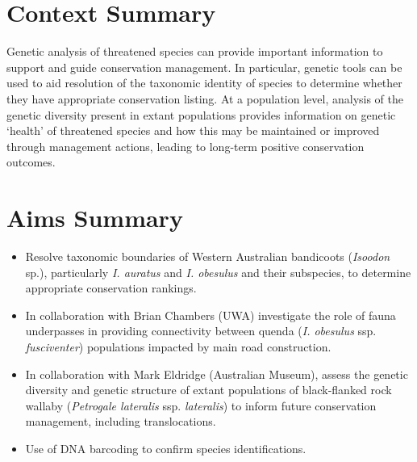 \documentclass[version=last, paper=a4, DIV=18, usenames, dvipsnames]{scrartcl}
\begin{document}
%

%




\section*{Context Summary}
Genetic analysis of threatened species can provide important information
to support and guide conservation management. In particular, genetic
tools can be used to aid resolution of the taxonomic identity of species
to determine whether they have appropriate conservation listing. At a
population level, analysis of the genetic diversity present in extant
populations provides information on genetic `health' of threatened
species and how this may be maintained or improved through management
actions, leading to long-term positive conservation outcomes.



\section*{Aims Summary}
\begin{itemize}
\itemsep1pt\parskip0pt
\item
  Resolve taxonomic boundaries of Western Australian bandicoots
  (\emph{Isoodon} sp.), particularly \emph{I. auratus} and \emph{I.
  obesulus} and their subspecies, to determine appropriate conservation
  rankings.
\item
  In collaboration with Brian Chambers (UWA) investigate the role of
  fauna underpasses in providing connectivity between quenda (\emph{I.
  obesulus} ssp. \emph{fusciventer}) populations impacted by main road
  construction.
\item
  In collaboration with Mark Eldridge (Australian Museum), assess the
  genetic diversity and genetic structure of extant populations of
  black-flanked rock wallaby (\emph{Petrogale lateralis} ssp.
  \emph{lateralis}) to inform future conservation management, including
  translocations.
\item
  Use of DNA barcoding to confirm species identifications.
\end{itemize}
\end{document}
